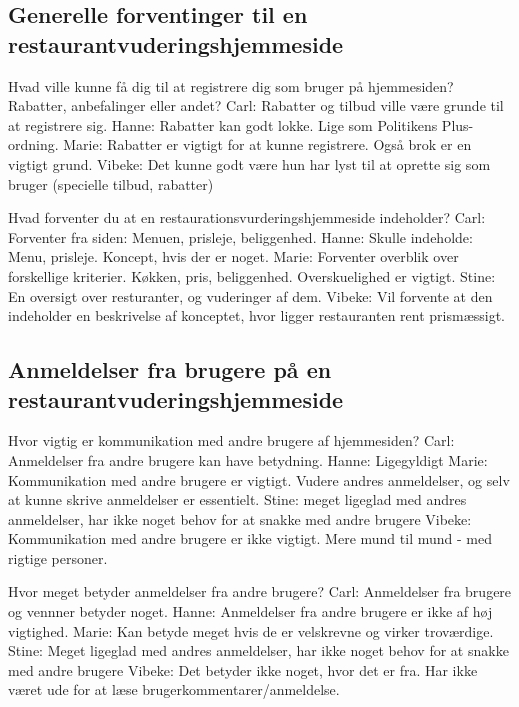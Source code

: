 \documentclass[a4paper, 12pt]{article}
\begin{document}
\subsection{Generelle forventinger til en restaurantvuderingshjemmeside}

  Hvad ville kunne få dig til at registrere dig som bruger på hjemmesiden?
  Rabatter, anbefalinger eller andet?
    Carl: Rabatter og tilbud ville være grunde til at registrere sig.
    Hanne: Rabatter kan godt lokke. Lige som Politikens Plus-ordning.
    Marie: Rabatter er vigtigt for at kunne registrere. Også brok er en vigtigt grund.
    Vibeke: Det kunne godt være hun har lyst til at oprette sig som bruger (specielle
	    tilbud, rabatter)

  Hvad forventer du at en restaurationsvurderingshjemmeside indeholder?
    Carl: Forventer fra siden: Menuen, prisleje, beliggenhed.
    Hanne: Skulle indeholde: Menu, prisleje. Koncept, hvis der er noget.
    Marie: Forventer overblik over forskellige kriterier. Køkken, pris, beliggenhed.
	   Overskuelighed er vigtigt.
    Stine: En oversigt over resturanter, og vuderinger af dem.
    Vibeke: Vil forvente at den indeholder en beskrivelse af konceptet, hvor ligger
	    restauranten rent prismæssigt.

\subsection{Anmeldelser fra brugere på en restaurantvuderingshjemmeside}

  Hvor vigtig er kommunikation med andre brugere af hjemmesiden?
    Carl: Anmeldelser fra andre brugere kan have betydning.
    Hanne: Ligegyldigt
    Marie: Kommunikation med andre brugere er vigtigt. Vudere andres anmeldelser, 
	   og selv at kunne skrive anmeldelser er essentielt.
    Stine: meget ligeglad med andres anmeldelser, har ikke noget behov for at snakke med andre brugere
    Vibeke: Kommunikation med andre brugere er ikke vigtigt. Mere mund til mund - med
	    rigtige personer.

  Hvor meget betyder anmeldelser fra andre brugere?
    Carl: Anmeldelser fra brugere og vennner betyder noget.
    Hanne: Anmeldelser fra andre brugere er ikke af høj vigtighed.
    Marie: Kan betyde meget hvis de er velskrevne og virker troværdige.
    Stine: Meget ligeglad med andres anmeldelser, har ikke noget behov for at snakke med andre brugere
    Vibeke: Det betyder ikke noget, hvor det er fra. Har ikke været ude for at læse
	    brugerkommentarer/anmeldelse.
\end{document}
